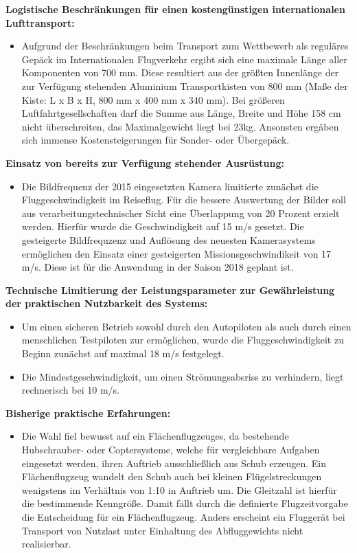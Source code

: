 \textbf{Logistische Beschränkungen für einen kostengünstigen internationalen Lufttransport:}
\begin{itemize}
\item Aufgrund der Beschränkungen beim Transport zum Wettbewerb als reguläres Gepäck im Internationalen Flugverkehr ergibt sich eine maximale Länge aller Komponenten von 700 mm. Diese resultiert aus der größten Innenlänge der zur Verfügung stehenden Aluminium Transportkisten von 800 mm (Maße der Kiste: L x B x H, 800 mm x 400 mm x 340 mm). Bei größeren Luftfahrtgesellschaften darf die Summe aus Länge, Breite und Höhe 158 cm nicht überschreiten, das Maximalgewicht liegt bei 23kg. Ansonsten ergäben sich immense Kostensteigerungen für Sonder- oder Übergepäck. 
\end{itemize}

\textbf{Einsatz von bereits zur Verfügung stehender Ausrüstung:}
\begin{itemize}
\item Die Bildfrequenz der 2015 eingesetzten Kamera limitierte zunächst die Fluggeschwindigkeit im Reiseflug. Für die bessere Auswertung der Bilder soll aus verarbeitungstechnischer Sicht eine Überlappung von 20 Prozent erzielt werden. Hierfür wurde die Geschwindigkeit auf 15 m/s gesetzt. Die gesteigerte Bildfrequzenz und Auflösung des neuesten Kamerasystems ermöglichen den Einsatz einer gesteigerten Missionsgeschwindikeit von 17 m/s. Diese ist für die Anwendung in der Saison 2018 geplant ist.
\end{itemize}

\textbf{Technische Limitierung der Leistungsparameter zur Gewährleistung der praktischen Nutzbarkeit des Systems:}
\begin{itemize}
\item Um einen sicheren Betrieb sowohl durch den Autopiloten als auch durch einen menschlichen Testpiloten zur ermöglichen, wurde die Fluggeschwindigkeit zu Beginn zunächst auf maximal 18 m/s festgelegt.
\item Die Mindestgeschwindigkeit, um einen Strömungsabsriss zu verhindern, liegt rechnerisch bei 10 m/s.
\end{itemize}

\clearpage

\textbf{Bisherige praktische Erfahrungen:}
\begin{itemize}
\item Die Wahl fiel bewusst auf ein Flächenflugzeuges, da bestehende Hubschrauber- oder Coptersysteme, welche für vergleichbare  Aufgaben eingesetzt werden, ihren Auftrieb ausschließlich aus Schub erzeugen. Ein Flächenflugzeug wandelt den Schub auch bei kleinen Flügelstreckungen wenigstens im Verhältnis von 1:10 in Auftrieb um. Die Gleitzahl ist hierfür  die bestimmende Kenngröße. Damit fällt durch die definierte Flugzeitvorgabe die Entscheidung für ein Flächenflugzeug. Anders erscheint ein Fluggerät bei Transport von Nutzlast unter Einhaltung des Abfluggewichts nicht realisierbar.
\end{itemize}

